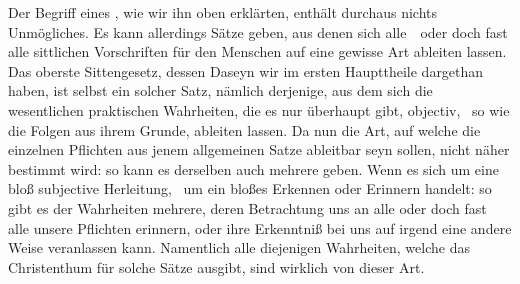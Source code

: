 Der Begriff eines , wie wir ihn oben erklärten, enthält durchaus nichts Unmögliches. Es kann allerdings Sätze geben, aus denen sich alle~\ oder doch fast alle sittlichen Vorschriften für den Menschen auf eine gewisse Art ableiten lassen. Das oberste Sittengesetz, dessen Daseyn wir im ersten Haupttheile dargethan haben, ist selbst ein solcher Satz, nämlich derjenige, aus dem sich die wesentlichen praktischen Wahrheiten, die es nur überhaupt gibt, objectiv, \dh\  so wie die Folgen aus ihrem Grunde, ableiten lassen. Da nun die Art, auf welche die einzelnen Pflichten aus jenem allgemeinen Satze ableitbar seyn sollen, nicht näher bestimmt wird: so kann es derselben auch mehrere geben. Wenn es sich um eine bloß subjective Herleitung, \dh\  um ein bloßes Erkennen oder Erinnern handelt: so gibt es der Wahrheiten mehrere, deren Betrachtung uns an alle oder doch fast alle unsere Pflichten erinnern, oder ihre Erkenntniß bei uns auf irgend eine andere Weise veranlassen kann. Namentlich alle diejenigen Wahrheiten, welche das Christenthum für solche Sätze ausgibt, sind wirklich von dieser Art.
